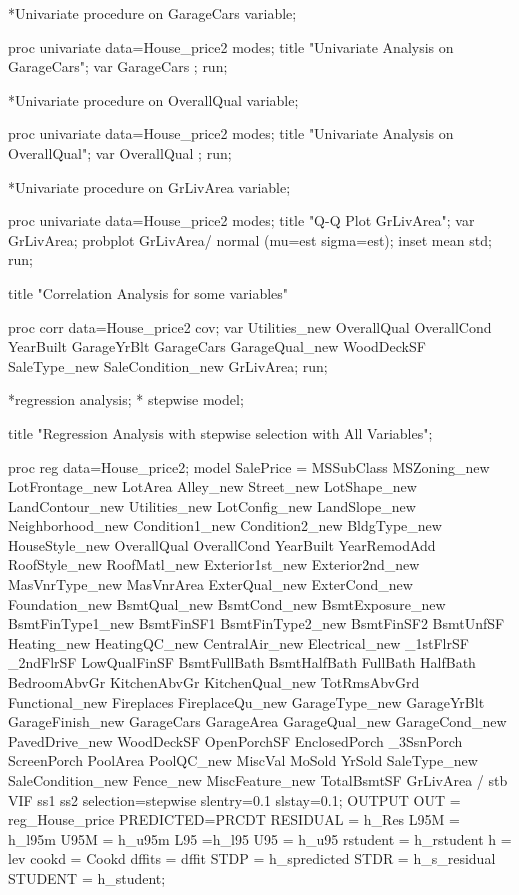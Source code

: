 *Univariate procedure on GarageCars variable;

proc univariate data=House_price2 modes;
title "Univariate Analysis on GarageCars";
var GarageCars ;
run;

*Univariate procedure on OverallQual variable;

proc univariate data=House_price2 modes;
title "Univariate Analysis on OverallQual";
var OverallQual ;
run;

*Univariate procedure on GrLivArea variable;

proc univariate data=House_price2 modes;
title "Q-Q Plot GrLivArea";
var GrLivArea;
probplot GrLivArea/ normal (mu=est sigma=est);
inset mean std;
run;



title	"Correlation Analysis for some variables"

proc corr data=House_price2  cov;
var 	Utilities_new	OverallQual		OverallCond		YearBuilt						
		GarageYrBlt		GarageCars		GarageQual_new	WoodDeckSF		
		SaleType_new	SaleCondition_new	GrLivArea;
run;

*regression analysis;
* stepwise model;

title "Regression Analysis with stepwise selection with All Variables";

proc reg data=House_price2;
	model 	SalePrice =		
			MSSubClass		MSZoning_new	LotFrontage_new	LotArea				Alley_new
			Street_new		LotShape_new	LandContour_new	Utilities_new		LotConfig_new
			LandSlope_new	Neighborhood_new Condition1_new	Condition2_new		BldgType_new
			HouseStyle_new	OverallQual		OverallCond		YearBuilt			YearRemodAdd	
			RoofStyle_new	RoofMatl_new	Exterior1st_new	Exterior2nd_new		MasVnrType_new	
			MasVnrArea		ExterQual_new	ExterCond_new	Foundation_new		BsmtQual_new
			BsmtCond_new	BsmtExposure_new BsmtFinType1_new BsmtFinSF1		BsmtFinType2_new
			BsmtFinSF2		BsmtUnfSF		Heating_new		HeatingQC_new		CentralAir_new
			Electrical_new	_1stFlrSF		_2ndFlrSF		LowQualFinSF		BsmtFullBath
			BsmtHalfBath	FullBath		HalfBath		BedroomAbvGr		KitchenAbvGr
			KitchenQual_new	TotRmsAbvGrd	Functional_new	Fireplaces			FireplaceQu_new
			GarageType_new	GarageYrBlt		GarageFinish_new GarageCars			GarageArea
			GarageQual_new	GarageCond_new	PavedDrive_new	WoodDeckSF			OpenPorchSF
			EnclosedPorch	_3SsnPorch		ScreenPorch		PoolArea			PoolQC_new
			MiscVal			MoSold			YrSold			SaleType_new		SaleCondition_new	
			Fence_new		MiscFeature_new TotalBsmtSF		GrLivArea		
	/   stb     VIF ss1 ss2 selection=stepwise slentry=0.1 slstay=0.1;
	OUTPUT OUT = reg_House_price PREDICTED=PRCDT RESIDUAL = h_Res
	L95M = h_l95m U95M  = h_u95m L95 =h_l95 U95 = h_u95 
	rstudent = h_rstudent h = lev cookd = Cookd dffits = dffit 
	STDP = h_spredicted STDR = h_s_residual STUDENT = h_student;
      
